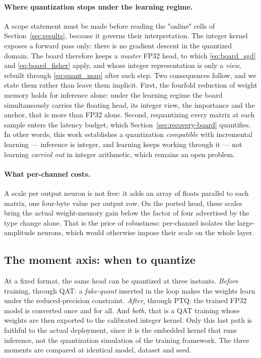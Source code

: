 \paragraph{Where quantization stops under the learning regime.} A scope statement must be made before
reading the "online" cells of Section~\ref{sec:results}, because it governs their interpretation. The
integer kernel exposes a forward pass only: there is no gradient descent in the quantized domain. The
board therefore keeps a \emph{master} FP32 head, to which \eqref{eq:board_sgd} and
\eqref{eq:board_fisher} apply, and whose integer representation is only a \emph{view}, rebuilt through
\eqref{eq:quant_map} after each step. Two consequences follow, and we state them rather than leave them
implicit. First, the fourfold reduction of weight memory holds for inference alone: under the learning
regime the board simultaneously carries the floating head, its integer view, the importance and the
anchor, that is more than FP32 alone. Second, requantizing every matrix at each sample enters the latency
budget, which Section~\ref{sec:recovery-board} quantifies. In other words, this work establishes a
quantization \emph{compatible} with incremental learning --- inference is integer, and learning keeps
working through it --- not learning \emph{carried out} in integer arithmetic, which remains an open
problem.

\paragraph{What per-channel costs.} A scale per output neuron is not free: it adds an array of floats
parallel to each matrix, one four-byte value per output row. On the ported head, these scales bring the
actual weight-memory gain below the factor of four advertised by the type change alone. That is the
price of robustness: per-channel isolates the large-amplitude neurons, which would otherwise impose
their scale on the whole layer.

\subsection{The moment axis: when to quantize}

At a fixed format, the same head can be quantized at three instants. \emph{Before} training, through QAT:
a \emph{fake-quant} inserted in the loop makes the weights learn under the reduced-precision constraint.
\emph{After}, through PTQ: the trained FP32 model is converted once and for all. And \emph{both}, that is
a QAT training whose weights are then exported to the calibrated integer kernel. Only this last path is
faithful to the actual deployment, since it is the embedded kernel that runs inference, not the
quantization simulation of the training framework. The three moments are compared at identical model,
dataset and seed.

